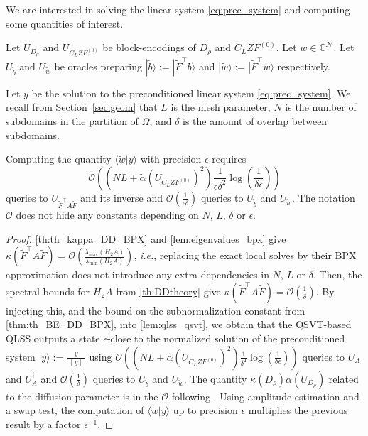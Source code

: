 \documentclass[onefignum,onetabnum]{siamart251216}
\newcommand{\Htwo}{H_2}
\newcommand{\ket}[1]{ | #1 \rangle}
\newcommand{\braket}[2]{ \langle #1| #2 \rangle}
\newcommand{\bigO}[1]{\mathcal{O}\left( #1 \right)}
\begin{document}
We are interested in solving the linear system \cref{eq:prec_system} and computing some quantities of interest.
\begin{theorem}
Let $U_{D_\rho}$ and $U_{C_L Z F^{(0)}}$ be block-encodings of $D_\rho$ and $C_L Z F^{(0)}$. Let $w \in \mathbb{C}^{\mathcal{N}}$. Let $U_{\tilde{b}}$ and $U_{\tilde{w}}$ be oracles preparing $\ket{\tilde{b}} := \ket{{\tilde F}^\top {b}} $ and $\ket{\tilde{w}}:= \ket{{\tilde F}^\top {w}}$ respectively. 

Let $y$ be the solution to the preconditioned linear system \eqref{eq:prec_system}. We recall from Section~\ref{sec:geom} that $L$ is the mesh parameter, $N$ is the number of subdomains in the partition of $\Omega$, and $\delta$ is the amount of overlap between subdomains.

Computing the quantity $\braket{\tilde{w}}{y}$ with precision $\epsilon$ requires 
\[
\bigO{ \left( N L + \tilde{\alpha} \left(U_{C_L Z F^{(0)}} \right)^2 \right) \frac{1}{\epsilon \delta^2} \log\left(\frac{1}{\delta \epsilon}\right)}
\]
queries to $U_{\tilde{F}^\top A \tilde{F}}$ and its inverse and $\bigO{\frac{1}{\epsilon \delta}}$ queries to $U_{\tilde{b}}$ and $U_{\tilde{w}}$. The notation $\mathcal O$ does not hide any constants depending on $N$, $L$, $\delta$ or $\epsilon$. 
\label{thm:QLSS_DD_BPX}
\end{theorem}


\begin{proof}
\cref{th:th_kappa_DD_BPX} and \cref{lem:eigenvalues_bpx} give $\kappa(\tilde{F}^\top A \tilde{F}) = \bigO{\frac{\lambda_{\max}(\Htwo A)}{\lambda_{\min}(\Htwo A)}}$, \textit{i.e.}, replacing the exact local solves by their BPX approximation does not introduce any extra dependencies in $N$, $L$ or $\delta$.
Then, the spectral bounds for $\Htwo A$ from \cref{th:DDtheory} give $\kappa(\tilde{F}^\top A \tilde{F}) = \bigO{\frac{1}{\delta}}$.
By injecting this, and the bound on the subnormalization constant from \cref{thm:th_BE_DD_BPX}, into \cref{lem:qlss_qsvt}, we obtain that the QSVT-based QLSS  outputs a state $\epsilon$-close to the normalized solution of the preconditioned system $\ket{y} := \frac{ y}{\| y \|}$ using $\bigO{ \left( N L + \tilde{\alpha} \left(U_{C_L Z F^{(0)}} \right)^2 \right) \frac{1}{\delta^2} \log\left(\frac{1}{\delta \epsilon}\right)}$ queries to $U_A$ and $U_A^\dag$ and $\bigO{\frac{1}{\delta}}$ queries to $U_{\tilde{b}}$ and $U_{\tilde{w}}$. The quantity $\kappa(D_\rho) \tilde{\alpha}(U_{D_\rho})$ related to the diffusion parameter is in the $\mathcal O$ following \cite[Proposition 3.4]{Deiml_2025}. 
Using amplitude estimation and a swap test, the computation of $\braket{\tilde{w}}{y}$ up to precision $\epsilon$ multiplies the previous result by a factor $\epsilon^{-1}$. 
\end{proof}
\end{document}
